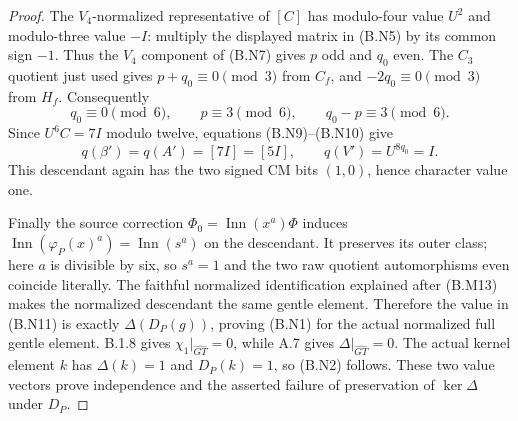 \begin{proof}
The $V_4$-normalized representative of $[C]$
has modulo-four value $U^2$ and modulo-three
value $-I$: multiply the displayed matrix in
(B.N5) by its common sign $-1$.  Thus the
$V_4$ component of (B.N7) gives $p$ odd and
$q_0$ even.  The $C_3$ quotient just used gives
$p+q_0\equiv0\pmod3$ from $C_f$, and
$-2q_0\equiv0\pmod3$ from $H_f$.  Consequently
\[
 q_0\equiv0\pmod6,\qquad p\equiv3\pmod6,
 \qquad q_0-p\equiv3\pmod6.                   \tag{B.N10}
\]
Since $U^6C=7I$ modulo twelve, equations
(B.N9)--(B.N10) give
\[
 q(\beta')=q(A')=[7I]=[5I],\qquad
 q(V')=U^{8q_0}=I.                              \tag{B.N11}
\]
This descendant again has the two signed CM bits
$(1,0)$, hence character value one.

Finally the source correction
$\Phi_0=\operatorname{Inn}(x^a)\Phi$ induces
$\operatorname{Inn}(\varphi_P(x)^a)
=\operatorname{Inn}(s^a)$ on the descendant.
It preserves its outer class; here $a$ is divisible
by six, so $s^a=1$ and the two raw quotient
automorphisms even coincide literally.  The
faithful normalized identification explained after
(B.M13) makes the normalized descendant the same
gentle element.  Therefore the value in
(B.N11) is exactly $\Delta(D_P(g))$, proving
(B.N1) for the actual normalized full gentle
element.  B.1.8 gives $\chi_1|_{\widehat{GT}}=0$,
while A.7 gives $\Delta|_{\widehat{GT}}=0$.
The actual kernel element $k$ has
$\Delta(k)=1$ and $D_P(k)=1$, so (B.N2) follows.
These two value vectors prove independence and
the asserted failure of preservation of
$\ker\Delta$ under $D_P$.
\end{proof}
